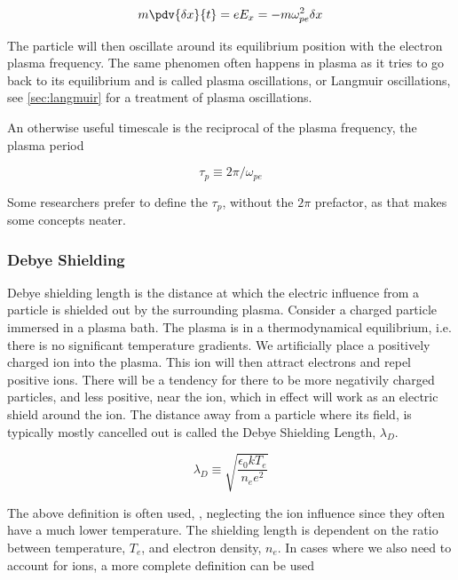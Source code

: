 		\begin{equation}
			m\pdv{\delta x}{t} = eE_x = -m\omega_{pe}^2\delta x
		\end{equation}

		The particle will then oscillate around its equilibrium position with
		the electron plasma frequency. The same phenomen often happens in plasma as
		it tries to go back to its equilibrium and is called plasma oscillations,
		or Langmuir oscillations, see \cref{sec:langmuir} for a treatment of plasma oscillations.

		An otherwise useful timescale is the reciprocal of the plasma frequency,
		the plasma period

		\begin{equation}
			\tau_p \equiv 2\pi/\omega_{pe}
		\end{equation}

		Some researchers prefer to define the \(\tau_p\), without the \(2\pi\) prefactor,
		as that makes some concepts neater.

		\subsubsection{Debye Shielding}
		Debye shielding length is the distance at which the electric influence
		from a particle is shielded out by the surrounding plasma.
		Consider a charged particle immersed in a plasma bath. The plasma is in
		a thermodynamical equilibrium, i.e. there is no significant temperature
		gradients. We artificially place a positively charged ion into the plasma.
		This ion will then attract electrons and repel positive ions. There will be a tendency
		for there to be more negativily charged particles, and less positive, near the
		ion, which in effect will work as an electric shield around the ion. The
		distance away from a particle where its field, is typically mostly cancelled
		out is called the Debye Shielding Length, \(\lambda_D\).

		\begin{equation}
			\lambda_D \equiv \sqrt{\frac{\epsilon_0 kT_e}{n_e e^2}}
		\end{equation}

		The above definition is often used, \citep{pecseli_waves_2012},
		neglecting the ion influence since they often have a much lower temperature.
		The shielding length is dependent on the ratio between temperature, \(T_e\),
		and electron density, \(n_e\).
		In cases where we also need to account for ions, a more complete definition can be used

